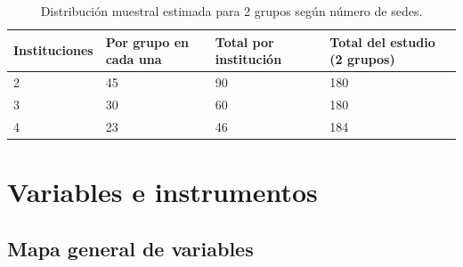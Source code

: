 \documentclass[12pt,a4paper,openany]{report}
\begin{document}
    \begin{table}[htbp]
        \centering
        \caption{Distribuci\'on muestral estimada para 2 grupos seg\'un n\'umero de sedes.}
        \label{tab:sedes}
        \small
        \begin{tabular}{C{2.8cm} C{3.4cm} C{3.2cm} C{3.2cm}}
            \toprule
            \textbf{Instituciones} & \textbf{Por grupo en cada una} & \textbf{Total por instituci\'on} & \textbf{Total del estudio (2 grupos)} \\
             & 45 & 90 & 180 \\
            3 & 30 & 60 & 180 \\
            4 & 23 & 46 & 184 \\
            \bottomrule
        \end{tabular}
    \end{table}
    
    \chapter{Variables e instrumentos}
    \label{cap:variables}
    
    \section{Mapa general de variables}
    
\end{document}
